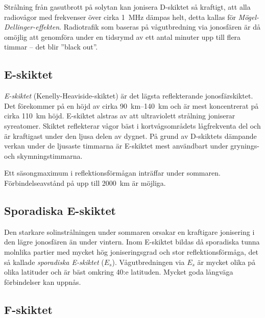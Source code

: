Strålning från gasutbrott på solytan kan jonisera D-skiktet så kraftigt, att
alla radiovågor med frekvenser över cirka \qty{1}{\mega\hertz} dämpas helt,
detta kallas för \emph{Mögel-Dellinger-effekten}.
Radiotrafik som baseras på vågutbredning via jonosfären är då
omöjlig att genomföra under en tidsrymd av ett antal minuter upp till
flera timmar -- det blir ''black out''.

\subsection{E-skiktet}
\label{e-skiktet}

\emph{E-skiktet} (Kenelly-Heaviside-skiktet) är det lägsta reflekterande
jonosfärskiktet.
Det förekommer på en höjd av cirka \SIrange{90}{140}{\kilo\metre} och är mest
koncentrerat på cirka \qty{110}{\kilo\metre} höjd.
E-skiktet alstras av att ultraviolett strålning joniserar syreatomer.
Skiktet reflekterar vågor bäst i kortvågsområdets lågfrekventa del och är
kraftigast under den ljusa delen av dygnet.
På grund av D-skiktets dämpande verkan under de ljusaste timmarna är E-skiktet
mest användbart under grynings- och skymningstimmarna.

Ett säsongmaximum i reflektionsförmågan inträffar under sommaren.
Förbindelseavstånd på upp till \qty{2000}{\kilo\metre} är möjliga.

\subsection{Sporadiska E-skiktet}
\label{sporadiskt_e}

Den starkare solinstrålningen under sommaren orsakar en kraftigare
jonisering i den lägre jonosfären än under vintern.
Inom E-skiktet bildas då sporadiska tunna molnlika partier med mycket hög
joniseringsgrad och stor reflektionsförmåga, det så kallade \emph{sporadiska
E-skiktet} (\(E_s\)).
Vågutbredningen via \(E_s\) är mycket olika på olika latituder och är bäst
omkring 40:e latituden.
Mycket goda långväga förbindelser kan uppnås.


\subsection{F-skiktet}

